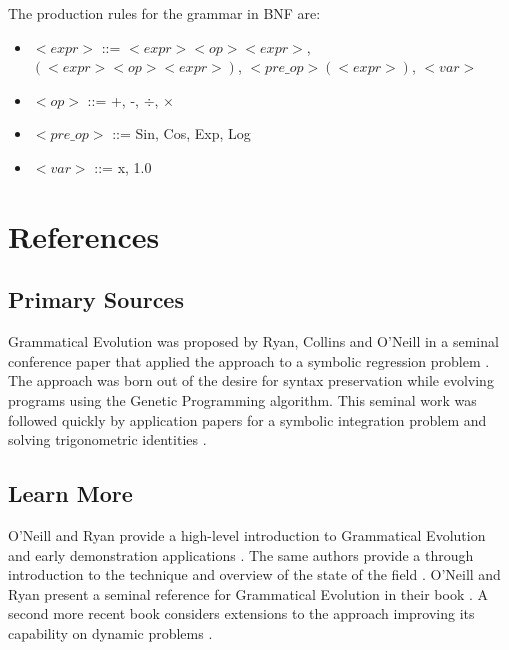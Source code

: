 \documentclass[a4paper, 11pt]{article}
\begin{document}
The production rules for the grammar in BNF are:
\begin{itemize}
	\item $<expr>$ ::= $<expr><op><expr>$, $(<expr><op><expr>)$, $<pre\_op>(<expr>)$, $<var>$
	\item $<op>$ ::= +, -, $\div$, $\times$
	\item $<pre\_op>$ ::= Sin, Cos, Exp, Log
	\item $<var>$ ::= x, 1.0
\end{itemize}




\section{References}
\label{sec:references}

% 
% 
\subsection{Primary Sources}
Grammatical Evolution was proposed by Ryan, Collins and O'Neill in a seminal conference paper that applied the approach to a symbolic regression problem \cite{Ryan1998a}. 
The approach was born out of the desire for syntax preservation while evolving programs using the Genetic Programming algorithm.
This seminal work was followed quickly by application papers for a symbolic integration problem \cite{O'Neill1998, O'Neill1998a} and solving trigonometric identities \cite{Ryan1998}.

% 
% 
\subsection{Learn More}
O'Neill and Ryan provide a high-level introduction to Grammatical Evolution and early demonstration applications \cite{O'Neill1999}. The same authors provide a through introduction to the technique and overview of the state of the field \cite{O'Neill2001}.
O'Neill and Ryan present a seminal reference for Grammatical Evolution in their book \cite{O'Neill2003}. A second more recent book considers extensions to the approach improving its capability on dynamic problems \cite{Dempsey2009}. 
\end{document}
